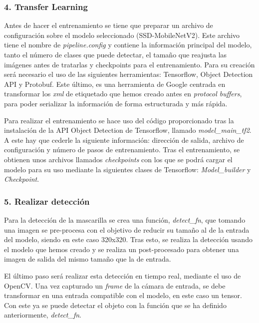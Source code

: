 \vspace{-0.5cm}
\subsubsection*{4. Transfer Learning}
\vspace{-0.7cm}
Antes de hacer el entrenamiento se tiene que preparar un archivo de configuración sobre el modelo seleccionado (SSD-MobileNetV2). Este archivo tiene el nombre de \textit{pipeline.config} y contiene la información principal del modelo, tanto el número de clases que puede detectar, el tamaño que reajusta las imágenes antes de tratarlas y checkpoints para el entrenamiento. Para su creación será necesario el uso de las siguientes herramientas: Tensorflow, Object Detection API y Protobuf. Este último, es una herramienta de Google centrada en transformar los \textit{xml} de etiquetado que hemos creado antes en \textit{protocol buffers}, para poder serializar la información de forma estructurada y más rápida.

Para realizar el entrenamiento se hace uso del código proporcionado tras la instalación de la API Object Detection de Tensorflow, llamado \textit{model\_main\_tf2}. A este hay que cederle la siguiente información: dirección de salida, archivo de configuración y número de pasos de entrenamiento. Tras el entrenamiento, se obtienen unos archivos llamados \textit{checkpoints} con los que se podrá cargar el modelo para su uso mediante la siguientes clases de Tensorflow: \textit{Model\_builder} y \textit{Checkpoint}.

\vspace{-0.5cm}
\subsubsection*{5. Realizar detección}
\vspace{-0.7cm}
Para la detección de la mascarilla se crea una función, \textit{detect\_fn}, que tomando una imagen se pre-procesa con el objetivo de  reducir su tamaño al de la entrada del modelo, siendo en este caso 320x320. Tras esto, se realiza la detección usando el modelo que hemos creado y se realiza un post-procesado para obtener una imagen de salida del mismo tamaño que la de entrada.

El último paso será realizar esta detección en tiempo real, mediante el uso de OpenCV. Una vez capturado un \textit{frame} de la cámara de entrada, se debe transformar en una entrada compatible con el modelo, en este caso un tensor. Con este ya se puede detectar el objeto con la función que se ha definido anteriormente, \textit{detect\_fn}. 

